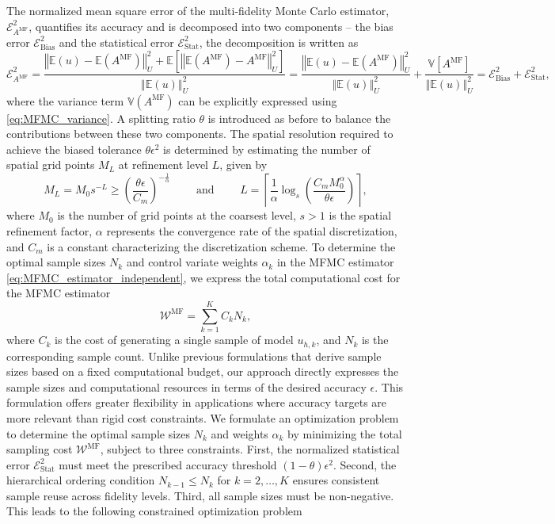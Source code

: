 %
The normalized mean square error of the multi-fidelity Monte Carlo estimator, $\mathcal{E}_{A^{\text{MF}}}^2$, quantifies its accuracy and is decomposed into two components -- the bias error $\mathcal{E}_{\text{Bias}}^2$ and the statistical error $\mathcal{E}_{\text{Stat}}^2$, the decomposition is written as 
%
\[
\mathcal{E}_{A^{\text{MF}}}^2= \frac{\left\Vert\mathbb{E}(u)-\mathbb{E}(A^{\text{MF}}) \right\Vert_{U}^2+\mathbb E\left[\left\Vert\mathbb{E}(A^{\text{MF}})-A^{\text{MF}} \right\Vert_{U}^2\right]}{\left\Vert\mathbb{E}(u) \right\Vert_{U}^2} =\frac{\left\Vert\mathbb{E}(u)-\mathbb{E}(A^{\text{MF}}) \right\Vert_{U}^2}{\left\Vert\mathbb{E}(u) \right\Vert_{U}^2}+ \frac{\mathbb{V}\left[A^{\text{MF}}\right]}{\left\Vert\mathbb{E}(u) \right\Vert_{U}^2}=\mathcal{E}_{\text{Bias}}^2 + \mathcal{E}_{\text{Stat}}^2,
\]
%
where the variance term $\mathbb{V}\left(A^{\text{MF}}\right)$  can be explicitly expressed using \eqref{eq:MFMC_variance}. A splitting ratio $\theta$ is introduced as before to balance the contributions between these two components. The spatial resolution required to achieve the biased tolerance $\theta \epsilon^2$ is determined by estimating the number of spatial grid points $M_L$ at refinement level $L$, given by
%
\begin{equation}
    \label{eq:SLSGC_MLS_SpatialGridsNo}
    M_L = M_0s^{-L} \ge \left(\frac{\theta\epsilon}{C_m}\right)^{-\frac 1 {\alpha}} \qquad \text{ and } \qquad     L = \left\lceil \frac{1}{\alpha}\log_s \left(\frac{C_m M_0^\alpha}{\theta\epsilon}\right) \right\rceil,
\end{equation}
%
where $M_0$ is the number of grid points at the coarsest level, $s>1$ is the spatial refinement factor, $\alpha$ represents the convergence rate of the spatial discretization, and $C_m$ is a constant characterizing the discretization scheme. To determine the optimal sample sizes $N_k$ and control variate weights $\alpha_k$ in the MFMC estimator \eqref{eq:MFMC_estimator_independent}, we express the total computational cost for the MFMC estimator
%
\[
\mathcal{W}^{\text{MF}} = \sum_{k=1}^K C_kN_k,
\]
%
where $C_k$ is the cost of generating a single sample of model $u_{h,k}$, and $N_k$ is the corresponding sample count. Unlike previous formulations \cite{PeWiGu:2016} that derive sample sizes based on a fixed computational budget, our approach directly expresses the sample sizes and computational resources in terms of the desired accuracy $\epsilon$. This formulation offers greater flexibility in applications where accuracy targets are more relevant than rigid cost constraints. We formulate an optimization problem to determine the optimal sample sizes $N_k$ and weights $\alpha_k$ by minimizing the total sampling cost $\mathcal{W}^{\text{MF}}$, subject to three constraints. First, the normalized statistical error $\mathcal{E}_{\text{Stat}}^2$ must meet the prescribed accuracy threshold $(1-\theta)\epsilon^2$. Second,  the hierarchical ordering condition $N_{k-1}\le N_k$ for $k=2,\ldots, K$ ensures consistent sample reuse across fidelity levels. Third, all sample sizes must be non-negative. This leads to the following constrained optimization problem
